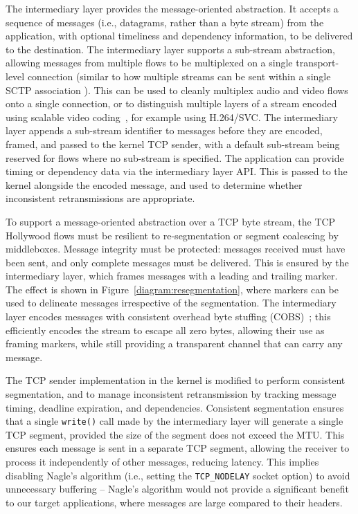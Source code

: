 The intermediary layer provides the message-oriented abstraction. It accepts
a sequence of messages (i.e., datagrams, rather than a byte stream) from the
application, with optional timeliness and dependency information,
to be delivered to the destination.
%
%
The intermediary layer supports a sub-stream abstraction, allowing messages from multiple flows
to be multiplexed on a single transport-level connection (similar to how multiple streams
can be sent within a single SCTP association \cite{rfc:4960}).  This can
be used to cleanly multiplex audio and video flows onto a single
connection, or to distinguish multiple layers of a stream encoded using
scalable video coding~\cite{Ohm05}, for example using H.264/SVC.
%
The intermediary layer appends a sub-stream identifier to messages before
they are encoded, framed, and passed to the kernel TCP sender, with a
default sub-stream being reserved for flows where no sub-stream is
specified.  The application can provide timing or dependency data via
the intermediary layer API. This is passed to the kernel alongside the
encoded message, and used to determine whether inconsistent
retransmissions are appropriate.

To support a message-oriented abstraction over a TCP byte stream, the
TCP Hollywood flows must be resilient to re-segmentation or segment coalescing
by middleboxes. Message integrity must be protected: messages received
must have been sent, and only complete messages must be delivered.  This
is ensured by the intermediary layer, which frames messages with a leading
and trailing marker. The effect is shown in Figure~\ref{diagram:resegmentation},
where markers can be used to delineate messages irrespective of the
segmentation. The intermediary layer encodes messages with consistent overhead
byte stuffing (COBS)~\cite{CB97COBS}; this efficiently encodes the stream
to escape all zero bytes, allowing their use as framing markers, while still
providing a transparent channel that can carry any message.

The TCP sender implementation in the kernel is modified to perform
consistent segmentation, and to manage inconsistent retransmission
by tracking message timing, deadline expiration, and dependencies.
Consistent segmentation ensures that a single \texttt{write()} call made
by the intermediary layer will generate a single TCP segment, provided the
size of the segment does not exceed the MTU.
This ensures each message is sent in a separate TCP segment, allowing the
receiver to process it independently of other messages, reducing latency.
This implies disabling Nagle's algorithm (i.e., setting
the \texttt{TCP\_NODELAY} socket option) to avoid unnecessary buffering --
Nagle's algorithm would not provide a significant benefit to our target
applications, where messages are large compared to their headers.

